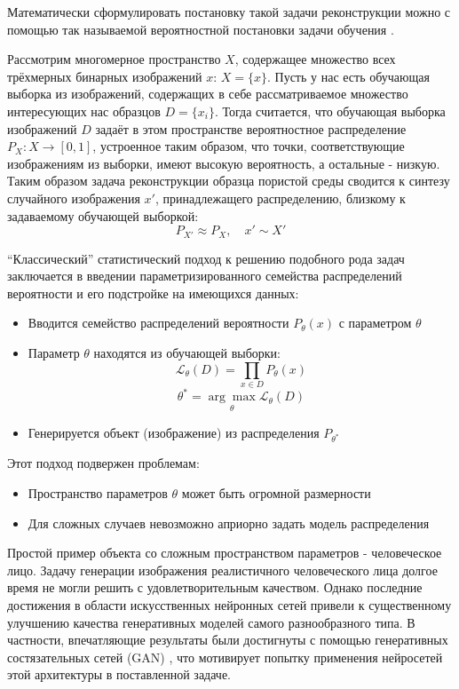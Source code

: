 	Математически сформулировать постановку такой задачи реконструкции можно с помощью так называемой вероятностной постановки задачи обучения \cite{Vorontsov, Goodfellow}.
	
	Рассмотрим многомерное пространство $X$, содержащее множество всех трёхмерных бинарных изображений $x$: $X = \{x\}$. Пусть у нас есть обучающая выборка из изображений, содержащих в себе рассматриваемое множество интересующих нас образцов $D = \{x_i\}$. Тогда считается, что  обучающая выборка изображений $D$ задаёт в этом пространстве вероятностное распределение $P_X : X \longrightarrow [0,1]$, устроенное таким образом, что точки, соответствующие изображениям из выборки, имеют высокую вероятность, а остальные - низкую. Таким образом задача реконструкции образца пористой среды сводится к синтезу случайного изображения $x'$, принадлежащего распределению, близкому к задаваемому обучающей выборкой:
	$$ P_{X'} \approx P_X, \quad x' \sim X'$$
	
	``Классический'' статистический подход к решению подобного рода задач заключается в введении параметризированного семейства распределений вероятности и его подстройке на имеющихся данных:
	
	\begin{itemize}
		\item Вводится семейство распределений вероятности $P_{\theta}(x)$ с параметром $\theta$
		\item Параметр $\theta$ находятся из обучающей выборки:
		$$ \mathcal{L}_{\theta}(D) = \prod_{x \in D} P_{\theta}(x) $$
		$$ \theta^{*} = \underset{\theta}{\arg\max} \mathcal{L}_{\theta}(D)$$
		\item Генерируется объект (изображение) из распределения $ P_{\theta^{*}}$
	\end{itemize}
	
	Этот подход подвержен проблемам:
	
	\begin{itemize}
		\item Пространство параметров $\theta$ может быть огромной размерности
		\item Для сложных случаев невозможно априорно задать модель распределения
	\end{itemize}
	
	Простой пример объекта со сложным пространством параметров - человеческое лицо. Задачу генерации изображения реалистичного человеческого лица долгое время не могли решить с удовлетворительным качеством. Однако последние достижения в области искусственных нейронных сетей привели к существенному улучшению качества генеративных моделей самого разнообразного типа. В частности, впечатляющие результаты были достигнуты с помощью генеративных состязательных сетей (GAN) \cite{Mirza, Gauthier, Zhao, Berthelot}, что мотивирует попытку применения нейросетей этой архитектуры в поставленной задаче.
	
